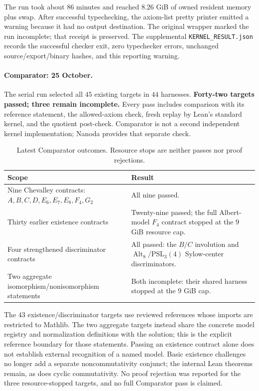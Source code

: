 \documentclass[11pt]{article}
\numberwithin{equation}{section}
\theoremstyle{definition}
\newcommand{\PSL}{\mathrm{PSL}}
\newcommand{\Alt}{\operatorname{Alt}}
\newcommand{\leanname}[1]{{\small\nolinkurl{#1}}}
\begin{document}
The run took about $86$ minutes and reached $8.26$ GiB of owned resident
memory plus swap. After successful typechecking, the axiom-list pretty
printer emitted a warning because it had no output destination. The
original wrapper marked the run incomplete; that receipt is preserved.
The supplemental \leanname{KERNEL_RESULT.json} records the successful
checker exit, zero typechecker errors, unchanged source/export/binary
hashes, and this reporting warning.

\paragraph{Comparator: 25 October.}
The serial run selected all $45$ existing targets in $44$ harnesses.
\textbf{Forty-two targets passed; three remain incomplete.}
Every pass includes comparison with its reference statement, the
allowed-axiom check, fresh replay by Lean's standard kernel, and the
quotient post-check. Comparator is not a second independent kernel
implementation; Nanoda provides that separate check.

\begin{table}[!htbp]
\centering\small
\begin{tabularx}{\textwidth}{@{}>{\raggedright\arraybackslash}p{}>{\raggedright\arraybackslash}X@{}}
\toprule Scope & Result\\
\midrule
Nine Chevalley contracts: $A,B,C,D,E_6,E_7,E_8,F_4,G_2$
& All nine passed.\\
Thirty earlier existence contracts
& Twenty-nine passed; the full Albert-model $F_4$ contract stopped at
the $9$ GiB resource cap.\\
Four strengthened discriminator contracts
& All passed: the $B/C$ involution and $\Alt_8/\PSL_3(4)$ Sylow-center
discriminators.\\
Two aggregate isomorphism/nonisomorphism statements
& Both incomplete: their shared harness stopped at the $9$ GiB cap.\\
\bottomrule
\end{tabularx}
\caption{Latest Comparator outcomes. Resource stops are neither passes
nor proof rejections.}
\label{tab:comparator-current}
\end{table}

The $43$ existence/discriminator targets use reviewed references whose
imports are restricted to Mathlib. The two aggregate targets instead
share the concrete model registry and normalization definitions with the
solution; this is the explicit reference boundary for those statements.
Passing an existence contract alone does not establish external
recognition of a named model. Basic existence challenges no longer add
a separate noncommutativity conjunct; the internal Lean theorems remain,
as does cyclic commutativity. No proof rejection was reported for the
three resource-stopped targets, and no full Comparator pass is claimed.
\end{document}
